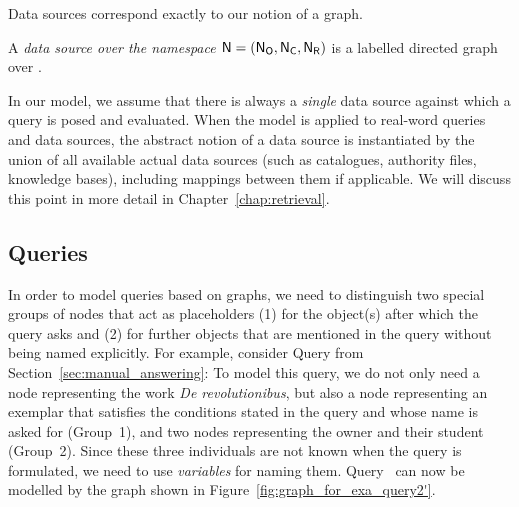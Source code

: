 Data sources correspond exactly to our notion of a graph.
%
\begin{definition}
  \label{def:data_source}
  A \emph{data source over the namespace $\textup{\textsf{N}}=(\mathsf{N}_\mathsf{O},\mathsf{N}_\mathsf{C},\mathsf{N}_\mathsf{R})$} is a labelled directed graph
  over \namespace.
\end{definition}
%
In our model, we assume that there is always a \emph{single} data source against which a query is posed and evaluated.
When the model is applied to real-word queries and data sources,
the abstract notion of a data source is instantiated by the union of
all available actual data sources (such as catalogues, authority files, knowledge bases),
including mappings between them if applicable.
We will discuss this point in more detail in Chapter~\ref{chap:retrieval}.

\subsection{Queries}

In order to model queries based on graphs, we need to distinguish
two special groups of nodes that act as placeholders (1) for the object(s) after which the query asks
and (2) for further objects that are mentioned in the query without being named explicitly.
For example, consider Query  from Section~\ref{sec:manual_answering}:
%
\Qtwoprime
%
To model this query, we do not only need a node representing the work \emph{De revolutionibus},
but also a node representing an exemplar that satisfies the conditions stated in the query and whose name is asked for (Group~1),
and two nodes representing the owner and their student (Group~2).
Since these three individuals are not known when the query is formulated,
we need to use \emph{variables} for naming them.
Query~
can now be modelled by the graph shown in Figure~\ref{fig:graph_for_exa_query2'}.

